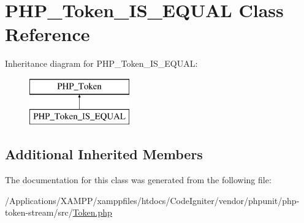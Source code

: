 \hypertarget{class_p_h_p___token___i_s___e_q_u_a_l}{}\section{P\+H\+P\+\_\+\+Token\+\_\+\+I\+S\+\_\+\+E\+Q\+U\+AL Class Reference}
\label{class_p_h_p___token___i_s___e_q_u_a_l}
Inheritance diagram for P\+H\+P\+\_\+\+Token\+\_\+\+I\+S\+\_\+\+E\+Q\+U\+AL\+:\begin{figure}[H]
\begin{center}
\leavevmode
\includegraphics[height=2.000000cm]{class_p_h_p___token___i_s___e_q_u_a_l}
\end{center}
\end{figure}
\subsection*{Additional Inherited Members}


The documentation for this class was generated from the following file\+:\begin{DoxyCompactItemize}
\item 
/\+Applications/\+X\+A\+M\+P\+P/xamppfiles/htdocs/\+Code\+Igniter/vendor/phpunit/php-\/token-\/stream/src/\mbox{\hyperlink{_token_8php}{Token.\+php}}\end{DoxyCompactItemize}
